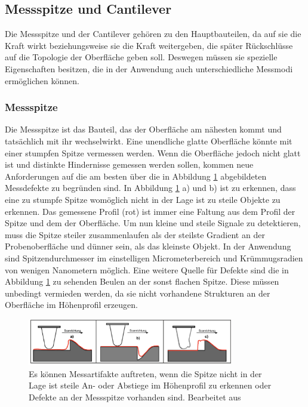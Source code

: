           \FloatBarrier






      \newpage


      \subsection{Messspitze und Cantilever}
        Die Messspitze und der Cantilever gehören zu den Hauptbauteilen, da auf sie die Kraft wirkt beziehungsweise sie die Kraft weitergeben, die später Rückschlüsse auf die Topologie der Oberfläche geben soll.
        Deswegen müssen sie spezielle Eigenschaften besitzen, die in der Anwendung auch unterschiedliche Messmodi ermöglichen können.

        \subsubsection*{Messspitze}
          Die Messspitze ist das Bauteil, das der Oberfläche am nähesten kommt und tatsächlich mit ihr wechselwirkt. Eine unendliche glatte Oberfläche könnte mit einer stumpfen Spitze vermessen werden. Wenn
          die Oberfläche jedoch nicht glatt ist und distinkte Hindernisse gemessen werden sollen, kommen neue Anforderungen auf die am besten über die in Abbildung \ref{fig:defekte} abgebildeten Messdefekte
          zu begründen sind. In Abbildung \ref{fig:defekte} a) und b) ist zu erkennen, dass eine zu stumpfe Spitze womöglich nicht in der Lage ist zu steile Objekte zu erkennen. Das gemessene Profil (rot) ist
          immer eine Faltung aus dem Profil der Spitze und dem der Oberfläche. Um nun kleine und steile Signale zu detektieren, muss die Spitze steiler zusammenlaufen als der steilste Gradient an der 
          Probenoberfläche und dünner sein, als das kleinste Objekt. In der Anwendung sind Spitzendurchmesser im einstelligen Micrometerbereich und Krümmugsradien von wenigen Nanometern möglich. Eine weitere
          Quelle für Defekte sind die in Abbildung \ref{fig:defekte} zu sehenden Beulen an der sonst flachen Spitze. Diese müssen unbedingt vermieden werden, da sie nicht vorhandene Strukturen an der Oberfläche
          im Höhenprofil erzeugen. 
        
          \FloatBarrier

          \begin{figure}[h]
            \centering
            \includegraphics[width = 0.8\textwidth]{pictures/defekte.png}
            \caption{Es können Messartifakte auftreten, wenn die Spitze nicht in der Lage ist steile An- oder Abstiege im Höhenprofil zu erkennen oder Defekte an der Messspitze vorhanden sind. Bearbeitet aus \cite{tu_dortmund_versuchsanleitung_nodate}}
            \label{fig:defekte}
          \end{figure}
        
